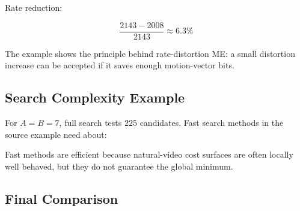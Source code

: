 \begin{center}
\end{center}

Rate reduction:

\[
\frac{2143-2008}{2143}\approx 6.3\%
\]

The example shows the principle behind rate-distortion ME: a small distortion increase can be accepted if it saves enough motion-vector bits.

\subsection{Search Complexity Example}

For $A=B=7$, full search tests $225$ candidates. Fast search methods in the source example need about:

\begin{center}
\end{center}

Fast methods are efficient because natural-video cost surfaces are often locally well behaved, but they do not guarantee the global minimum.

\subsection{Final Comparison}


